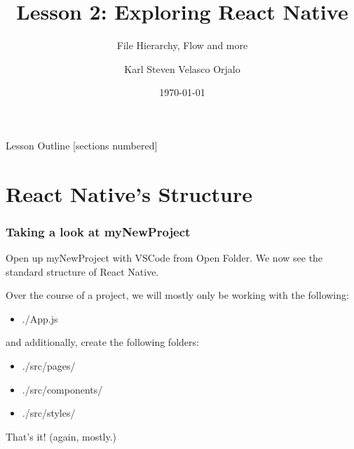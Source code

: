 \documentclass{beamer}
\title{Lesson 2: Exploring React Native}
\subtitle{File Hierarchy, Flow and more}
\date{\today}
\author{Karl Steven Velasco Orjalo}
\institute{React Native Quickstart}
\begin{document}
  \maketitle

  \begin{frame}{Lesson Outline}
    [sections numbered]
    \tableofcontents
  \end{frame}

  \section{React Native's Structure}
  \begin{frame}[fragile]
    \frametitle{Taking a look at myNewProject}
    Open up myNewProject with VSCode from Open Folder. 
    We now see the standard structure of React Native.

    Over the course of a project, we will mostly only be working with the following:
    \begin{itemize}
      \item ./App.js
    \end{itemize}

    and additionally, create the following folders:
    \begin{itemize}
      \item ./src/pages/
      \item ./src/components/
      \item ./src/styles/
    \end{itemize}

    That's it! (again, mostly.)
  \end{frame}
\end{document}
